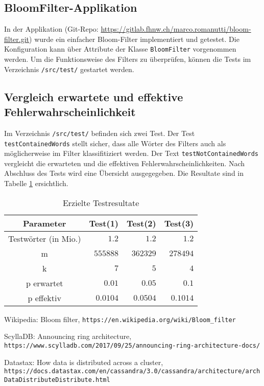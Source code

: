 \documentclass[10pt, a4paper, twocolumn]{article} %
\begin{document}
\subsection{BloomFilter-Applikation}

In der Applikation (Git-Repo: \url{https://gitlab.fhnw.ch/marco.romanutti/bloom-filter.git}) wurde ein einfacher Bloom-Filter implementiert und getestet.
Die Konfiguration kann über Attribute der Klasse \texttt{BloomFilter} vorgenommen werden.
Um die Funktionsweise des Filters zu überprüfen, können die Tests im Verzeichnis \texttt{/src/test/} gestartet werden.

\subsection{Vergleich erwartete und effektive Fehlerwahrscheinlichkeit}

Im Verzeichnis \texttt{/src/test/} befinden sich zwei Test.
Der Test \texttt{testContainedWords} stellt sicher, dass alle Wörter des Filters auch als möglicherweise im Filter klassifitiziert werden.
Der Text \texttt{testNotContainedWords} vergleicht die erwarteten und die effektiven Fehlerwahrscheinlichkeiten.
Nach Abschluss des Tests wird eine Übersicht ausgegegeben.
Die Resultate sind in Tabelle \ref{tests} ersichtlich.

\begin{table}[h]
	\caption{Erzielte Testresultate}
	\label{tests}
	\centering
	\begin{tabular}{crrr}
		\toprule
		\cmidrule(r){1-2}
		Parameter & Test(1) & Test(2) & Test(3) \\
		\midrule
		Testwörter (in Mio.) & $1.2$ & $1.2$ & $1.2$ \\
		m & $555888$ & $362329$ & $278494$ \\
		k & $7$ & $5$ & $4$ \\
		p erwartet & $0.01$ & $0.05$ & $0.1$ \\
		p effektiv & $0.0104$ & $0.0504$ & $0.1014$ \\
		\bottomrule
	\end{tabular}
\end{table}


\begin{thebibliography}{9}
	Wikipedia: Bloom filter,
	\texttt{https://en.wikipedia.org/wiki/Bloom\_filter}

	ScyllaDB: Announcing ring architecture,
	\texttt{https://www.scylladb.com/2017/09/25/announcing-ring-architecture-docs/}

	Datastax: How data is distributed across a cluster,
	\texttt{https://docs.datastax.com/en/cassandra/3.0/cassandra/architecture/archDataDistributeDistribute.html}
\end{thebibliography}
\end{document}

